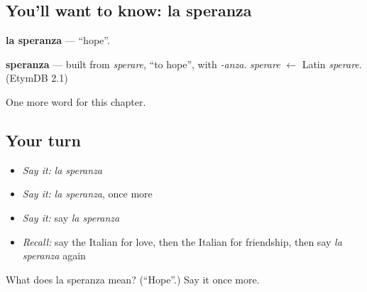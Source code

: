 \subsection*{You'll want to know: la speranza}
\textbf{la speranza} — \textquotedblleft{}hope\textquotedblright{}.

\begin{cousinweb}
\textbf{speranza} — built from \emph{sperare}, \textquotedblleft{}to hope\textquotedblright{}, with \emph{-anza}. \emph{sperare} $\leftarrow$ Latin \emph{sperare}. (EtymDB 2.1)
\end{cousinweb}

\begin{grammarlens}[title={What you've built}]
One more word for this chapter.
\end{grammarlens}

\subsection*{Your turn}
\begin{itemize}
\raggedright
  \item \emph{Say it:} \emph{la speranza}
  \item \emph{Say it:} \emph{la speranza}, once more
  \item \emph{Say it:} say \emph{la speranza}
  \item \emph{Recall:} say the Italian for love, then the Italian for friendship, then say \emph{la speranza} again
\end{itemize}

\begin{tcolorbox}[breakable,colback=teal!4,colframe=teal!35!black,title={Before you move on}]
What does la speranza mean? (\textquotedblleft{}Hope\textquotedblright{}.) Say it once more.
\end{tcolorbox}
